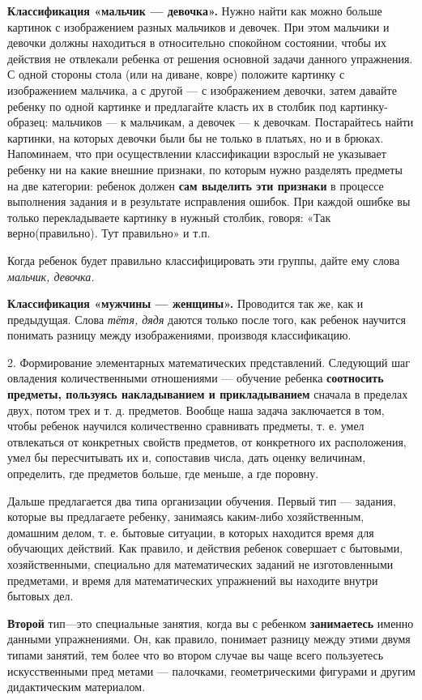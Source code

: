 \documentclass[a5paper]{book}
\renewcommand{\emph}[1]{\textit{#1}}
\begin{document}
\textbf{Классификация «мальчик --- девочка».} Нужно найти как можно
больше картинок с изображением разных мальчиков и девочек. При этом
мальчики и девочки должны находиться в относительно спокойном состоянии,
чтобы их действия не отвлекали ребенка от решения основной задачи
данного упражнения. С одной стороны стола (или на диване, ковре)
положите картинку с изображением мальчика, а с другой --- с изображением
девочки, затем давайте ребенку по одной картинке и предлагайте класть их
в столбик под картинку-образец: мальчиков --- к мальчикам, а девочек ---
к девочкам. Постарайтесь найти картинки, на которых девочки были бы не
только в платьях, но и в брюках. Напоминаем, что при осуществлении
классификации взрослый не указывает ребенку ни на какие внешние
признаки, по которым нужно разделять предметы на две категории: ребенок
должен \textbf{сам выделить эти признаки} в процессе выполнения задания
и в результате исправления ошибок. При каждой ошибке вы только
перекладываете картинку в нужный столбик, говоря: «Так верно(правильно).
Тут правильно» и т.п.

Когда ребенок будет правильно классифицировать эти группы, дайте ему
слова \emph{мальчик, девочка.}

\textbf{Классификация «мужчины --- женщины».} Проводится так же, как и
предыдущая. Слова \emph{тётя, дядя} даются только после того, как
ребенок научится понимать разницу между изображениями, производя
классификацию.

2. Формирование элементарных математических представлений. Следующий шаг
овладения количественными отношениями --- обучение ребенка
\textbf{соотносить предметы, пользуясь накладыванием и прикладыванием}
сначала в пределах двух, потом трех и т. д. предметов. Вообще наша
задача заключается в том, чтобы ребенок научился количественно
сравнивать предметы, т. е. умел отвлекаться от конкретных свойств
предметов, от конкретного их расположения, умел бы пересчитывать их и,
сопоставив числа, дать оценку величинам, определить, где предметов
больше, где меньше, а где поровну.

Дальше предлагается два типа организации обучения. Первый тип ---
задания, которые вы предлагаете ребенку, занимаясь каким-либо
хозяйственным, домашним делом, т. е. бытовые ситуации, в которых
находится время для обучающих действий. Как правило, и действия ребенок
совершает с бытовыми, хозяйственными, специально для математических
заданий не изготовленными предметами, и время для математических
упражнений вы находите внутри бытовых дел.

\textbf{Второй} тип---это специальные занятия, когда вы с ребенком
\textbf{занимаетесь} именно данными упражнениями. Он, как правило,
понимает разницу между этими двумя типами занятий, тем более что во
втором случае вы чаще всего пользуетесь искусственными пред метами ---
палочками, геометрическими фигурами и другим дидактическим материалом.
\end{document}
